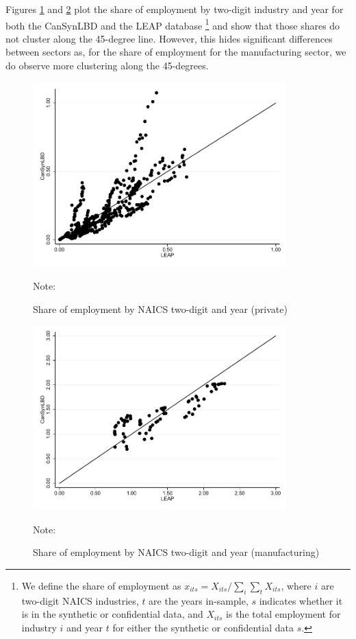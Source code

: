 \documentclass{article}
\begin{document}
Figures \ref{EmploymentSharePrivate} and \ref{EmploymentShareManufacturing} plot the share of employment by two-digit industry and year for both the CanSynLBD and the LEAP database
\footnote{We define the share of employment as $x_{its} = X_{its}/\sum_{i} \sum_{t} X_{its}$, where $i$ are two-digit NAICS industries, $t$ are the years in-sample, $s$ indicates whether it is in the synthetic or confidential data, and $X_{its}$ is the total employment for industry $i$ and year $t$ for either the synthetic or confidential data $s$.} and show that those shares do not cluster along the 45-degree line. However, this hides significant differences between sectors as, for the share of employment for the manufacturing sector, we do observe more clustering along the 45-degrees.
\begin{figure} [H]
\centering
\caption{Share of employment by NAICS two-digit and year (private)} \label{EmploymentSharePrivate}
\includegraphics[height=2.8in, width=.7\linewidth]{graphs/Share_of_employment_by_NAICS_two-digit_and_year_private_bw.pdf} 
\begin{minipage}{0.85\textwidth}
{\footnotesize Note: \TableNote \par}
\end{minipage}
\end{figure}
\vspace{-15.5pt}
\begin{figure} [H]
\centering
\caption{Share of employment by NAICS two-digit and year (manufacturing)} \label{EmploymentShareManufacturing}
\includegraphics[height=2.8in, width=.7\linewidth]{graphs/Share_of_employment_by_NAICS_two-digit_and_year_Manufacturing_bw.pdf} 
\begin{minipage}{0.85\textwidth}
{\footnotesize Note: \TableNote \par}
\end{minipage}
\end{figure}
\end{document}
